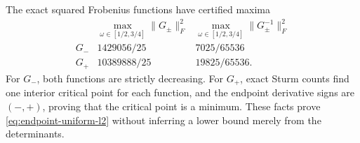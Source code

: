 \documentclass[11pt]{article}
\theoremstyle{definition}
\theoremstyle{remark}
\begin{document}
The exact squared Frobenius functions have certified maxima
\begin{equation}
\begin{array}{c|cc}
 & \max_{\omega\in[1/2,3/4]}\|G_\pm\|_F^2
 & \max_{\omega\in[1/2,3/4]}\|G_\pm^{-1}\|_F^2\\ \hline
G_- & 1429056/25 & 7025/65536\\
G_+ & 10389888/25 & 19825/65536 .
\end{array}
\end{equation}
For \(G_-\), both functions are strictly decreasing.  For \(G_+\), exact
Sturm counts find one interior critical point for each function, and the
endpoint derivative signs are \((-,+)\), proving that the critical point is
a minimum.  These facts prove \eqref{eq:endpoint-uniform-l2} without
inferring a lower bound merely from the determinants.
\end{document}
